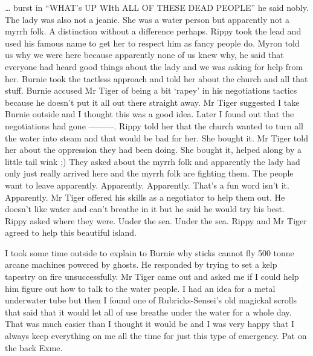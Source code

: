 … burst in “WHAT’s UP WIth ALL OF THESE DEAD PEOPLE” he said nobly. The lady was also not a jeanie. She was a water person but apparently not a myrrh folk. A distinction without a difference perhaps. Rippy took the lead and used his famous name to get her to respect him as fancy people do. Myron told us why we were here because apparently none of us knew why, he said that everyone had heard good things about the lady and we was asking for help from her. Burnie took the tactless approach and told her about the church and all that stuff. Burnie accused Mr Tiger of being a bit ‘rapey’ in his negotiations tactics because he doesn’t put it all out there straight away. Mr Tiger suggested I take Burnie outside and I thought this was a good idea. Later I found out that the negotiations had gone ---------. Rippy told her that the church wanted to turn all the water into steam and that would be bad for her. She bought it. Mr Tiger told her about the oppression they had been doing. She bought it, helped along by a little tail wink ;) They asked about the myrrh folk and apparently the lady had only just really arrived here and the myrrh folk are fighting them. The people want to leave apparently. Apparently. Apparently. That’s a fun word isn’t it. Apparently. Mr Tiger offered his skills as a negotiator to help them out. He doesn’t like water and can’t breathe in it but he said he would try his best. Rippy asked where they were. Under the sea. Under the sea. Rippy and Mr Tiger agreed to help this beautiful island.\medskip

I took some time outside to explain to Burnie why sticks cannot fly 500 tonne arcane machines powered by ghosts. He responded by trying to set a kelp tapestry on fire unsuccessfully. Mr Tiger came out and asked me if I could help him figure out how to talk to the water people. I had an idea for a metal underwater tube but then I found one of Rubricks-Sensei’s old magickal scrolls that said that it would let all of use breathe under the water for a whole day. That was much easier than I thought it would be and I was very happy that I always keep everything on me all the time for just this type of emergency. Pat on the back Exme.\medskip

